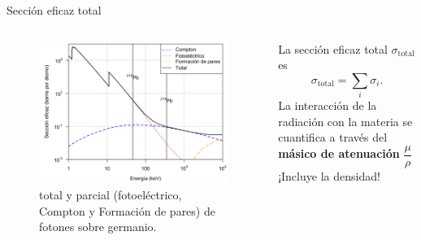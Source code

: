 \documentclass[9pt]{beamer}
\begin{document}
\begin{frame}{Sección eficaz total}
	\begin{columns}
		\begin{column}{0.65\textwidth}
		\begin{figure}
			\centering
			\includegraphics[width=1\textwidth]{Imagenes/CrossSectionGe.png}
			\caption{\justifying \hyperlink{SeccionEficaz}{} total y parcial (fotoeléctrico, Compton y Formación de pares) de fotones sobre germanio.}
		\end{figure}
		\end{column}
		\begin{column}{0.3\textwidth}  
		\justifying
		La sección eficaz total $\sigma_\text{total}$ es
		\begin{equation}
			\sigma_\text{total} = \sum_i \sigma_i.
		\end{equation}
		La interacción de la radiación con la materia se cuantifica a través del \hyperlink{Masico}{} \textbf{másico de atenuación}  $\dfrac{\mu}{\rho}$ 
\\ \vspace{1cm}
¡Incluye la densidad! 
		\end{column}
	\end{columns}
\end{frame}
\end{document}
